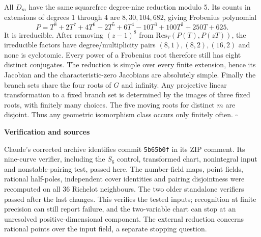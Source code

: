 \documentclass[12pt]{article}
\newcommand{\head}[1]{{\Large\bfseries\color{ink}#1}\par\vspace{3pt}}
\begin{document}
All $D_m$ have the same squarefree degree-nine reduction modulo 5. Its counts in extensions of degrees 1 through 4 are $8,30,104,682$, giving Frobenius polynomial
\[
 P=T^8+2T^7+4T^6-2T^5+6T^4-10T^3+100T^2+250T+625.
\]
It is irreducible. After removing $(z-1)^8$ from $\mathrm{Res}_T(P(T),P(zT))$, the irreducible factors have degree/multiplicity pairs $(8,1),(8,2),(16,2)$ and none is cyclotomic. Every power of a Frobenius root therefore still has eight distinct conjugates. The reduction is simple over every finite extension, hence its Jacobian and the characteristic-zero Jacobians are absolutely simple. Finally the branch sets share the four roots of $G$ and infinity. Any projective linear transformation to a fixed branch set is determined by the images of three fixed roots, with finitely many choices. The five moving roots for distinct $m$ are disjoint. Thus any geometric isomorphism class occurs only finitely often. \hfill$\square$

\newpage
\head{Verification and sources}
Claude's corrected archive identifies commit \texttt{5b65b0f} in its ZIP comment. Its nine-curve verifier, including the $S_6$ control, transformed chart, nonintegral input and nonstable-pairing test, passed here. The number-field maps, point fields, rational half-poles, independent cover identities and pairing disjointness were recomputed on all 36 Richelot neighbours. The two older standalone verifiers passed after the last changes. This verifies the tested inputs; recognition at finite precision can still report failure, and the two-variable chart can stop at an unresolved positive-dimensional component. The external reduction concerns rational points over the input field, a separate stopping question.
\end{document}
